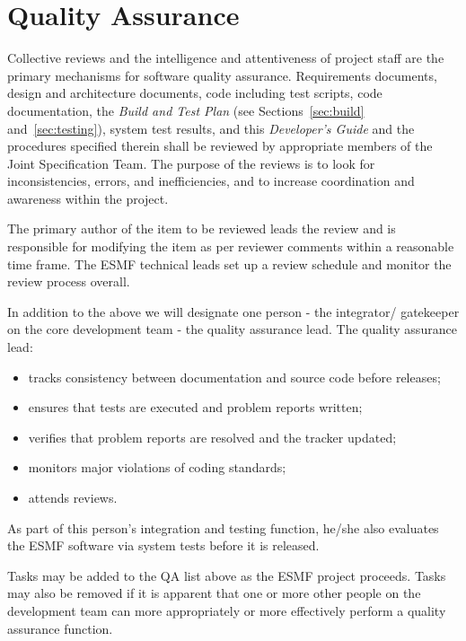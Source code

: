 
\section{Quality Assurance}
\label{sec:qa}

Collective reviews and the intelligence and attentiveness of project
staff are the primary mechanisms for software quality assurance.  
Requirements documents, design and architecture documents, code including
test scripts, code documentation, the {\it Build and Test Plan}
(see Sections~\ref{sec:build} and~\ref{sec:testing}), system test
results, and this {\it Developer's Guide} and the procedures specified
therein shall be reviewed by appropriate members of the Joint Specification 
Team.  The purpose of the reviews is to look for inconsistencies,
errors, and inefficiencies, and to increase coordination and awareness
within the project.

The primary author of the item to be reviewed leads the review and is
responsible for modifying the item as per reviewer comments within a 
reasonable time frame.  The ESMF technical leads set up a review schedule
and monitor the review process overall.

In addition to the above we will designate one person - the integrator/
gatekeeper on the core development team - the quality assurance lead.
The quality assurance lead:
\begin{itemize}
\item tracks consistency between documentation and source code before
      releases;
\item ensures that tests are executed and problem reports written;
\item verifies that problem reports are resolved and the tracker updated;
\item monitors major violations of coding standards;
\item attends reviews.
\end{itemize}

As part of this person's integration and testing function, he/she also
evaluates the ESMF software via system tests before it is released.

Tasks may be added to the QA list above as the ESMF project proceeds.
Tasks may also be removed if it is apparent that one or more other people 
on the development team can more appropriately or more effectively perform 
a quality assurance function.







